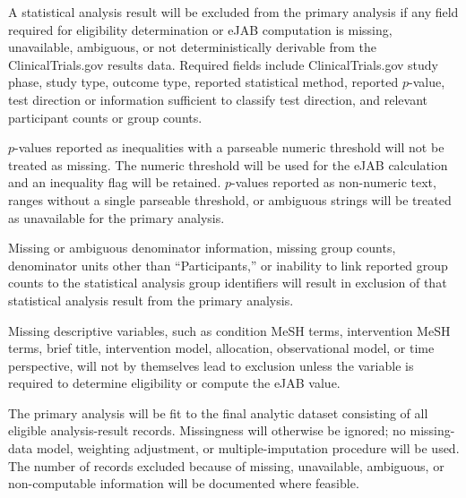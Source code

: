 \documentclass[11pt]{article}
\begin{document}
A statistical analysis result will be excluded from the primary analysis if any field required for eligibility determination or eJAB computation is missing, unavailable, ambiguous, or not deterministically derivable from the ClinicalTrials.gov results data. Required fields include ClinicalTrials.gov study phase, study type, outcome type, reported statistical method, reported \(p\)-value, test direction or information sufficient to classify test direction, and relevant participant counts or group counts.

\(p\)-values reported as inequalities with a parseable numeric threshold will not be treated as missing. The numeric threshold will be used for the eJAB calculation and an inequality flag will be retained. \(p\)-values reported as non-numeric text, ranges without a single parseable threshold, or ambiguous strings will be treated as unavailable for the primary analysis.

Missing or ambiguous denominator information, missing group counts, denominator units other than ``Participants,'' or inability to link reported group counts to the statistical analysis group identifiers will result in exclusion of that statistical analysis result from the primary analysis.

Missing descriptive variables, such as condition MeSH terms, intervention MeSH terms, brief title, intervention model, allocation, observational model, or time perspective, will not by themselves lead to exclusion unless the variable is required to determine eligibility or compute the eJAB value.

The primary analysis will be fit to the final analytic dataset consisting of all eligible analysis-result records. Missingness will otherwise be ignored; no missing-data model, weighting adjustment, or multiple-imputation procedure will be used. The number of records excluded because of missing, unavailable, ambiguous, or non-computable information will be documented where feasible.
\end{document}
